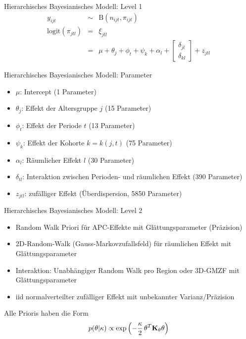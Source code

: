 \documentclass[german]{beamer}
\numberwithin{Bsp}{section}
\numberwithin{Def}{section}
\numberwithin{Stz}{section}
\begin{document}
\begin{frame}{Hierarchisches Bayesianisches Modell: Level 1}
\begin{eqnarray}
y_{ijt} &\sim& \mbox{B}(n_{ijt},\pi_{ijt})\\
\mbox{logit}(\pi_{jtl}) &=& \xi_{jtl} \\ 
&=& \mu + \theta_j + \phi_t + \psi_k + \alpha_l + \left[
\begin{array}{c}
\delta_{jl} \\
\delta_{kl}
\end{array}
\right] + z_{jtl}
\end{eqnarray}
\end{frame}
\begin{frame}{Hierarchisches Bayesianisches Modell: Parameter}
\begin{itemize}
\item $\mu$: Intercept (1 Parameter)
\item $\theta_j$: Effekt der Altersgruppe $j$ (15 Parameter)
\item $\phi_t$: Effekt der Periode $t$ (13 Parameter)
\item $\psi_k$: Effekt der Kohorte $k=k(j,t)$ (75 Parameter)
\item $\alpha_l$: Räumlicher Effekt $l$ (30 Parameter)
\item $\delta_{tl}$: Interaktion zwischen Perioden- und räumlichen Effekt (390 Parameter)
\item $z_{jtl}$: zufälliger Effekt (Überdispersion, 5850 Parameter)
\end{itemize}
\end{frame}

\begin{frame}{Hierarchisches Bayesianisches Modell: Level 2}
\begin{itemize}
\item Random Walk Priori für APC-Effekte mit Glättungsparameter (Präzision)
\item 2D-Random-Walk (Gauss-Markovzufallsfeld) für räumlichen Effekt mit Glättungsparameter
\item Interaktion: Unabhängiger Random Walk pro Region oder 3D-GMZF mit Glättungsparameter
\item iid normalverteilter zufälliger Effekt mit unbekannter Varianz/Präzision
\end{itemize}
Alle Prioris haben die Form
\begin{equation}
p({\bf \theta}|\kappa) \propto \exp \left(- \frac{\kappa}{2} \, {\bf \theta}^T {\bf K}_{\theta}
{\bf \theta} \right)
\end{equation}
\end{frame}
\end{document}
